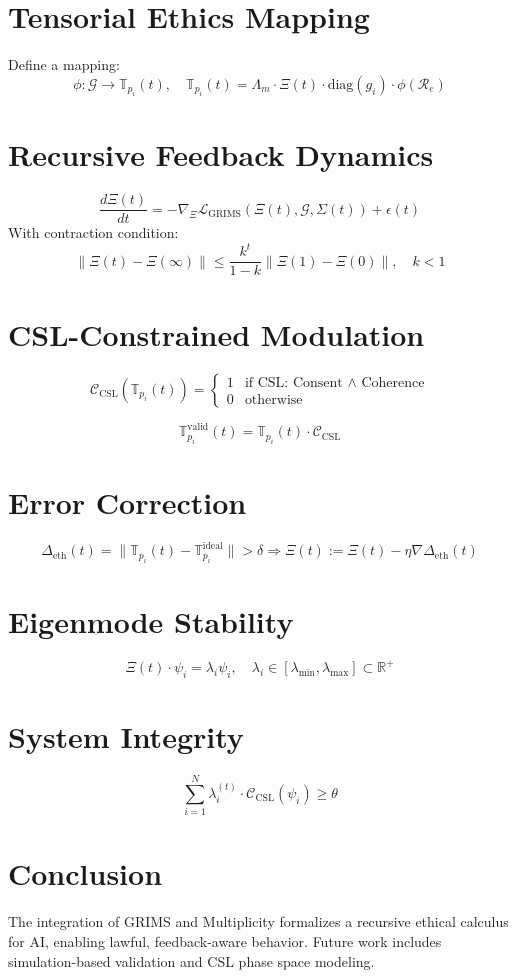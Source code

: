 \documentclass[12pt]{article}
\begin{document}
\section{Tensorial Ethics Mapping}
Define a mapping:
\[ \phi: \mathcal{G} \rightarrow \mathbb{T}_{p_i}(t), \quad \mathbb{T}_{p_i}(t) = \Lambda_m \cdot \Xi(t) \cdot \text{diag}(g_i) \cdot \phi(\mathcal{R}_e) \]

\section{Recursive Feedback Dynamics}
\[ \frac{d\Xi(t)}{dt} = -\nabla_{\Xi} \mathcal{L}_{\text{GRIMS}}(\Xi(t), \mathcal{G}, \Sigma(t)) + \epsilon(t) \]
With contraction condition:
\[ \|\Xi(t) - \Xi(\infty)\| \leq \frac{k^t}{1 - k} \|\Xi(1) - \Xi(0)\|, \quad k < 1 \]

\section{CSL-Constrained Modulation}
\[
\mathcal{C}_{\text{CSL}}(\mathbb{T}_{p_i}(t)) =
\begin{cases}
1 & \text{if CSL: Consent $\land$ Coherence} \\
0 & \text{otherwise}
\end{cases}
\]

\[ \mathbb{T}_{p_i}^{\text{valid}}(t) = \mathbb{T}_{p_i}(t) \cdot \mathcal{C}_{\text{CSL}} \]

\section{Error Correction}
\[ \Delta_{\text{eth}}(t) = \|\mathbb{T}_{p_i}(t) - \mathbb{T}_{p_i}^{\text{ideal}}\| > \delta \Rightarrow \Xi(t) := \Xi(t) - \eta \nabla \Delta_{\text{eth}}(t) \]

\section{Eigenmode Stability}
\[ \Xi(t) \cdot \psi_i = \lambda_i \psi_i, \quad \lambda_i \in [\lambda_{\text{min}}, \lambda_{\text{max}}] \subset \mathbb{R}^{+} \]

\section{System Integrity}
\[ \sum_{i=1}^{N} \lambda_i^{(t)} \cdot \mathcal{C}_{\text{CSL}}(\psi_i) \geq \theta \]

\section{Conclusion}
The integration of GRIMS and Multiplicity formalizes a recursive ethical calculus for AI, enabling lawful, feedback-aware behavior. Future work includes simulation-based validation and CSL phase space modeling.
\end{document}
